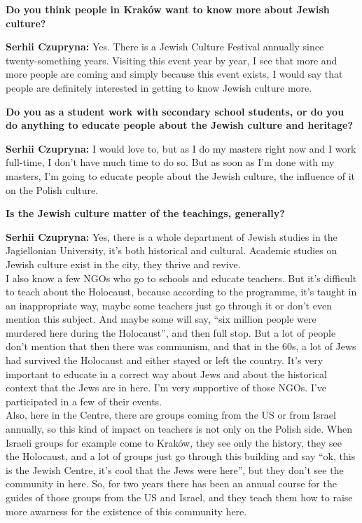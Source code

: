 \textbf{Do you think people in Kraków want to know more about Jewish culture?}\par
\textbf{Serhii Czupryna:} Yes. There is a Jewish Culture Festival annually since twenty-something years. Visiting this event year by year, I see that more and more people are coming and simply because this event exists, I would say that people are definitely interested in getting to know Jewish culture more.\par
\textbf{Do you as a student work with secondary school students, or do you do anything to educate people about the Jewish culture and heritage?} \par
\textbf{Serhii Czupryna:} I would love to, but as I do my masters right now and I work full-time, I don’t have much time to do so. But as soon as I’m done with my masters, I’m going to educate people about the Jewish culture, the influence of it on the Polish culture.\par
\textbf{Is the Jewish culture matter of the teachings, generally?}\par
\textbf{Serhii Czupryna:} Yes, there is a whole department of Jewish studies in the Jagiellonian University, it’s both historical and cultural. Academic studies on Jewish culture exist in the city, they thrive and revive.\\ 
I also know a few NGOs who go to schools and educate teachers. But it’s difficult to teach about the Holocaust, because according to the programme, it’s taught in an inappropriate way, maybe some teachers just go through it or don’t even mention this subject. And maybe some will say, ``six million people were murdered here during the Holocaust'', and then full stop. But a lot of people don’t mention that then there was communism, and that in the 60s, a lot of Jews had survived the Holocaust and either stayed or left the country. It’s very important to educate in a correct way about Jews and about the historical context that the Jews are in here. I’m very supportive of those NGOs. I’ve participated in a few of their events.\\
Also, here in the Centre, there are groups coming from the US or from Israel annually, so this kind of impact on teachers is not only on the Polish side. When Israeli groups for example come to Kraków, they see only the history, they see the Holocaust, and a lot of groups just go through this building and say ``ok, this is the Jewish Centre, it’s cool that the Jews were here'', but they don’t see the community in here. So, for two years there has been an annual course for the guides of those groups from the US and Israel, and they teach them how to raise more awarness for the existence of this community here.\par  
